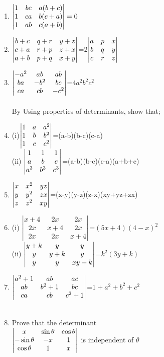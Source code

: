 \documentclass[journal,12pt,twocolumn]{IEEEtran}
\renewcommand\thesection{\arabic{section}}
\begin{document}
\begin{enumerate}[label=\thesection.\arabic*.,ref=\thesection.\theenumi]
\item $\begin{vmatrix}1&bc&a(b+c)\\1&ca&b(c+a)\\1&ab&c(a+b)\end{vmatrix}=0$
\\
\solution 
%
\item $\begin{vmatrix}b+c& q+r& y+z\\c+a& r+p& z+x\\a+b& p+q& x+y\end{vmatrix}$=2$\begin{vmatrix} a&p&x\\b&q&y\\c&r&z\end{vmatrix}$ 
\\
\solution 
%
\item $\begin{vmatrix}-a^2&ab&ab\\ ba&-b^2&bc\\ ca&cb&-c^2\end{vmatrix}$=$4a^2b^2c^2$\\
\\
\solution 
%
By Using properties of determinants, show that;
\item (i)$\begin{vmatrix}1&a&a^2\\1&b&b^2\\1&c&c^2\end{vmatrix}$=(a-b)(b-c)(c-a)\\
(ii) $\begin{vmatrix}1&1&1 \\ a&b&c \\ a^3&b^3&c^3\end{vmatrix}$=(a-b)(b-c)(c-a)(a+b+c)
\\
\solution 
%
\item $\begin{vmatrix}x&x^2&yz \\ y&y^2&zx \\ z&z^2&xy\end{vmatrix}$=(x-y)(y-z)(z-x)(xy+yz+zx)
\item (i) $\begin{vmatrix}x+4&2x&2x \\ 2x&x+4&2x \\ 2x&2x&x+4\end{vmatrix}$=$(5x+4)(4-x)^2$\\
\solution 
%
(ii) $\begin{vmatrix}y+k&y&y \\ y&y+k&y \\ y&y&xy+k\end{vmatrix}$=$k^2(3y+k)$
\\
\solution 
%

\item $\begin{vmatrix}a^2+1&ab&ac \\ ab&b^2+1&bc \\ ca&cb&c^2+1\end{vmatrix}$=$1+a^2+b^2+c^2$\\
\\
\solution 
%
\item Prove that the determinant \\
$\begin{vmatrix}
x &\sin\theta&\cos\theta \\ -\sin\theta&-x&1 \\ \cos\theta&1&x
\end{vmatrix}$ 
is independent of $\theta$
\\
\solution 
%


\end{enumerate}
\end{document}
